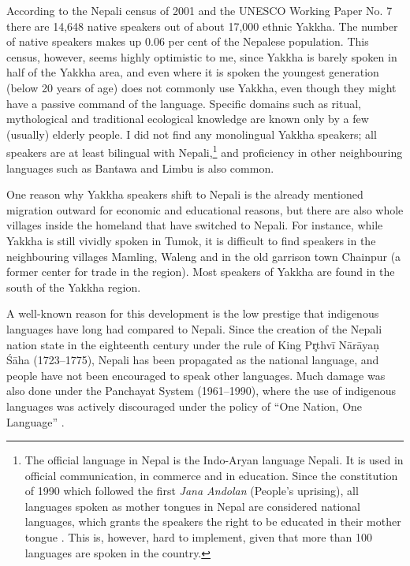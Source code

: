 According to the Nepali census of 2001 \citep{CBS2001Report} and the UNESCO Working Paper No. 7 \citep{Toba2005Unesco}  there are 14,648 native speakers out of about 17,000 ethnic Yakkha. The number of native speakers makes up 0.06 per cent of the Nepalese population. This census, however, seems highly optimistic to me, since Yakkha is barely spoken in half of the Yakkha area, and even where it is spoken the youngest generation (below 20 years of age) does not commonly use Yakkha, even though they might have a passive command of the language. Specific domains such as ritual, mythological and traditional ecological knowledge are known only by a few (usually) elderly people. I did not find any monolingual Yakkha speakers; all speakers are at least bilingual with Nepali,\footnote{The official language in Nepal is the Indo-Aryan language Nepali. It is used in official communication,  in commerce and in  education. Since the constitution of 1990 which followed the first \emph{Jana Andolan} (People's uprising), all languages spoken as mother tongues in Nepal are considered national languages, which grants the speakers the right to be educated in their mother tongue \citep{Turin2007_Diversity}. This is, however, hard to implement, given that more than 100 languages are spoken in the country.} and proficiency in other neighbouring languages such as Bantawa and Limbu is also common.

One reason why Yakkha  speakers shift to Nepali is the already mentioned migration outward for economic and educational reasons, but there are also whole  villages inside the  homeland that have switched to Nepali. For instance, while Yakkha is still vividly spoken in Tumok, it is difficult to find speakers in the neighbouring villages Mamling, Waleng and in the old garrison town Chainpur (a former center for trade in the region). Most speakers of Yakkha are found in the south of the Yakkha region.

A well-known reason for this development is the low prestige that indigenous languages have long  had compared to Nepali. Since the creation of the Nepali nation state in the eighteenth century under the rule of King Pr̥thvī Nārāyaṇ Śāha (1723–1775), Nepali has been propagated as the national language, and people have  not been encouraged to speak other languages. Much damage was also done under the Panchayat System (1961–1990), where the use of indigenous languages was actively discouraged under the policy of “One Nation, One Language” \citep[20]{Toba2005Unesco}.

